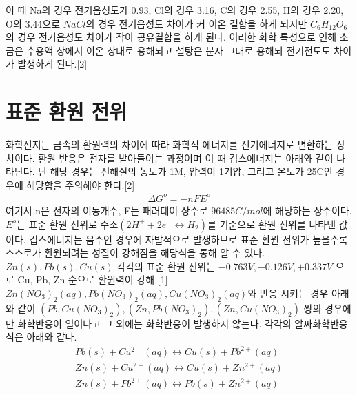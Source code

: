 \documentclass[%
 reprint,
 amsmath,amssymb,
 aps,
]{revtex4-2}
\begin{document}
이 때 Na의 경우 전기음성도가 0.93, Cl의 경우 3.16, C의 경우 2.55, H의 경우 2.20, O의 3.44으로 $NaCl$의 경우 전기음성도 차이가 커 이온 결합을 하게 되지만 $C_{6}H_{12}O_{6}$의 경우 전기음성도 차이가 작아 공유결합을 하게 된다. 이러한 화학 특성으로 인해 소금은 수용액 상에서 이온 상태로 용해되고 설탕은 분자 그대로 용해되 전기전도도 차이가 발생하게 된다.[2]


\section{\label{sec:level2}표준 환원 전위}
화학전지는 금속의 환원력의 차이에 따라 화학적 에너지를 전기에너지로 변환하는 장치이다. 환원 반응은 전자를 받아들이는 과정이며 이 때 깁스에너지는 아래와 같이 나타난다. 단 해당 경우는 전해질의 농도가 1M, 압력이 1기압, 그리고 온도가 25C인 경우에 해당함을 주의해야 한다.[2]
\begin{align}
\Delta G^{o} = -nFE^{o}
\end{align}
여기서 n은 전자의 이동개수, F는 패러데이 상수로 $96485C/mol$에 해당하는 상수이다. $E^{o}$는 표준 환원 전위로 수소$(2H^{+} + 2e^{-} \leftrightarrow H_{2})$를 기준으로 환원 전위를 나타낸 값이다. 깁스에너지는 음수인 경우에 자발적으로 발생하므로 표준 환원 전위가 높을수록 스스로가 환원되려는 성질이 강해짐을 해당식을 통해 알 수 있다. $Zn(s), Pb(s), Cu(s)$ 각각의 표준 환원 전위는 $-0.763V, -0.126V, +0.337V$ 으로 Cu, Pb, Zn 순으로 환원력이 강해 [1] $Zn(NO_{3})_{2}(aq), Pb(NO_{3})_{2}(aq), Cu(NO_{3})_{2}(aq)$와 반응 시키는 경우 아래와 같이 $(Pb, Cu(NO_{3})_{2}),(Zn, Pb(NO_{3})_{2}),(Zn, Cu(NO_{3})_{2})$ 쌍의 경우에만 화학반응이 일어나고 그 외에는 화학반응이 발생하지 않는다. 각각의 알짜화학반응식은 아래와 같다.
\begin{align}
Pb(s)+Cu^{2+}(aq)\leftrightarrow Cu(s) + Pb^{2+}(aq)\\
Zn(s)+Cu^{2+}(aq)\leftrightarrow Cu(s) + Zn^{2+}(aq)\\
Zn(s)+Pb^{2+}(aq)\leftrightarrow Pb(s) + Zn^{2+}(aq)
\end{align}
\end{document}
